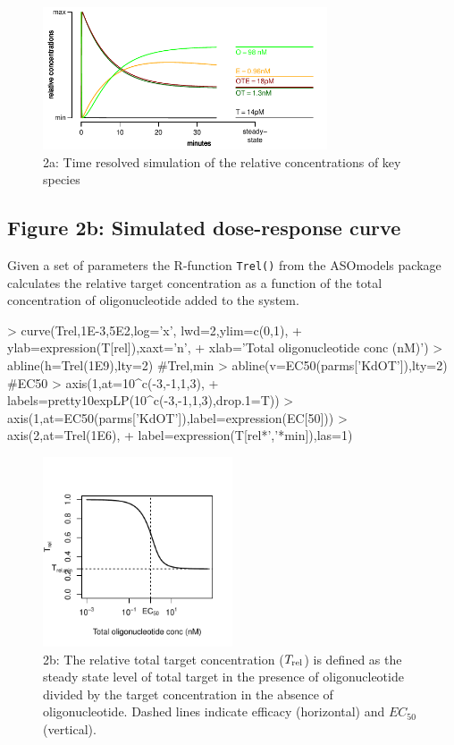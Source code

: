 \documentclass{article}
\newenvironment{Ncenter}{%
  \setlength\topsep{-10pt}
  \setlength\parskip{-100pt}
  \begin{center}
}{%
  \end{center}
}
\newcommand{\Trel}{T_{\rm{rel}}}
\begin{document}
\begin{figure}[!h]
\begin{Ncenter}
\includegraphics[width=0.75\textwidth]{Vignette2-Fig1}
\end{Ncenter}
\caption{2a: Time resolved simulation of the relative concentrations of key species}
\end{figure}

\subsection*{Figure 2b: Simulated dose-response curve}
Given a set of parameters the R-function \texttt{Trel()} from the ASOmodels package calculates the relative target concentration as a function of the total concentration of oligonucleotide added to the system.
\begin{Schunk}
\begin{Sinput}
> curve(Trel,1E-3,5E2,log='x', lwd=2,ylim=c(0,1),
+       ylab=expression(T[rel]),xaxt='n',
+       xlab='Total oligonucleotide conc (nM)')
> abline(h=Trel(1E9),lty=2) #Trel,min
> abline(v=EC50(parms['KdOT']),lty=2) #EC50
> axis(1,at=10^c(-3,-1,1,3),
+      labels=pretty10expLP(10^c(-3,-1,1,3),drop.1=T))
> axis(1,at=EC50(parms['KdOT']),label=expression(EC[50]))
> axis(2,at=Trel(1E6),
+      label=expression(T[rel*','*min]),las=1)
\end{Sinput}
\end{Schunk}
\begin{figure}[!h]
\begin{Ncenter}
\includegraphics[width=0.5\textwidth]{Vignette2-Fig2}
\end{Ncenter}
\caption{2b: The relative total target concentration ($\Trel$) is defined as the steady state level of total target in the presence of oligonucleotide divided by the target concentration in the absence of oligonucleotide. Dashed lines indicate efficacy (horizontal) and $EC_{50}$ (vertical).}
\end{figure}
\end{document}
